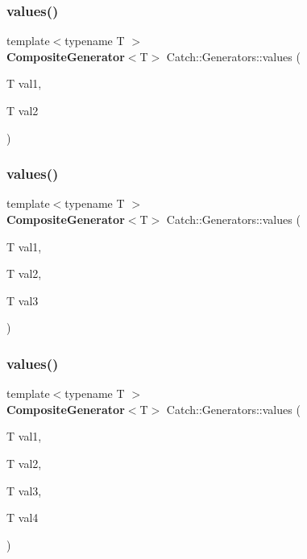 \subsubsection{values()\hspace{0.1cm}{\footnotesize\ttfamily [1/3]}}
{\footnotesize\ttfamily template$<$typename T $>$ \\
\textbf{ Composite\+Generator}$<$T$>$ Catch\+::\+Generators\+::values (\begin{DoxyParamCaption}\item[{T}]{val1,  }\item[{T}]{val2 }\end{DoxyParamCaption})}

\mbox{\label{namespace_catch_1_1_generators_a496c4a826107e47203b6c609cfd8c2c5}} 
\subsubsection{values()\hspace{0.1cm}{\footnotesize\ttfamily [2/3]}}
{\footnotesize\ttfamily template$<$typename T $>$ \\
\textbf{ Composite\+Generator}$<$T$>$ Catch\+::\+Generators\+::values (\begin{DoxyParamCaption}\item[{T}]{val1,  }\item[{T}]{val2,  }\item[{T}]{val3 }\end{DoxyParamCaption})}

\mbox{\label{namespace_catch_1_1_generators_afb1dcf02bfc8cdf990f27fdc7d7e4a4e}} 
\subsubsection{values()\hspace{0.1cm}{\footnotesize\ttfamily [3/3]}}
{\footnotesize\ttfamily template$<$typename T $>$ \\
\textbf{ Composite\+Generator}$<$T$>$ Catch\+::\+Generators\+::values (\begin{DoxyParamCaption}\item[{T}]{val1,  }\item[{T}]{val2,  }\item[{T}]{val3,  }\item[{T}]{val4 }\end{DoxyParamCaption})}

